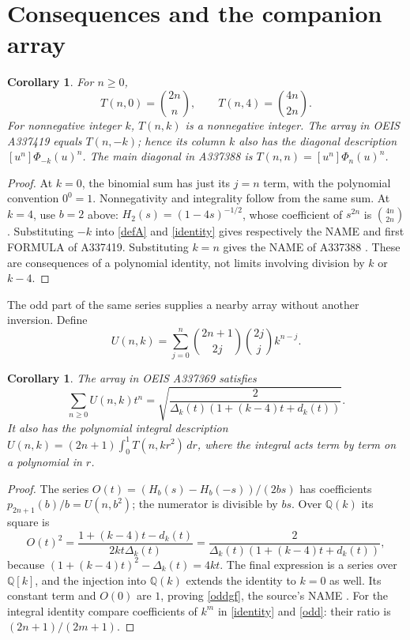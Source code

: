 \documentclass[11pt]{article}
\newtheorem{corollary}[theorem]{Corollary}
\begin{document}
\section{Consequences and the companion array}
\begin{corollary}\label{consequences}
For $n\geq0$,
\[
 T(n,0)=\binom{2n}n,\qquad T(n,4)=\binom{4n}{2n}.
\]
For nonnegative integer $k$, $T(n,k)$ is a nonnegative integer.
The array in OEIS A337419 equals $T(n,-k)$; hence its column $k$
also has the diagonal description $[u^n]\Phi_{-k}(u)^n$.
The main diagonal in A337388 is $T(n,n)=[u^n]\Phi_n(u)^n$.
\end{corollary}
\begin{proof}
At $k=0$, the binomial sum has just its $j=n$ term, with the
polynomial convention $0^0=1$. Nonnegativity and integrality follow
from the same sum. At $k=4$, use $b=2$ above:
$H_2(s)=(1-4s)^{-1/2}$, whose coefficient of $s^{2n}$ is
$\binom{4n}{2n}$. Substituting $-k$ into \eqref{defA} and
\eqref{identity} gives respectively the NAME and first FORMULA of
A337419. Substituting $k=n$ gives the NAME of A337388
\cite{signed,diagonal}. These are consequences of a polynomial identity,
not limits involving division by $k$ or $k-4$.
\end{proof}

The odd part of the same series supplies a nearby array without another
inversion. Define
\begin{equation}\label{odd}
 U(n,k)=\sum_{j=0}^n\binom{2n+1}{2j}\binom{2j}{j}k^{n-j}.
\end{equation}
\begin{corollary}\label{oddcor}
The array in OEIS A337369 satisfies
\begin{equation}\label{oddgf}
 \sum_{n\geq0}U(n,k)t^n
 =\sqrt{\frac{2}{\Delta_k(t)(1+(k-4)t+d_k(t))}}.
\end{equation}
It also has the polynomial integral description
$U(n,k)=(2n+1)\int_0^1T(n,kr^2)\,dr$,
where the integral acts term by term on a polynomial in $r$.
\end{corollary}
\begin{proof}
The series $O(t)=(H_b(s)-H_b(-s))/(2bs)$ has coefficients
$p_{2n+1}(b)/b=U(n,b^2)$; the numerator is divisible by $bs$.
Over $\mathbb Q(k)$ its square is
\[
 O(t)^2=\frac{1+(k-4)t-d_k(t)}{2kt\Delta_k(t)}
       =\frac{2}{\Delta_k(t)(1+(k-4)t+d_k(t))},
\]
because $(1+(k-4)t)^2-\Delta_k(t)=4kt$.
The final expression is a series over $\mathbb Q[k]$, and
the injection into $\mathbb Q(k)$ extends the identity to $k=0$
as well. Its constant term and $O(0)$ are $1$, proving
\eqref{oddgf}, the source's NAME \cite{oddarray}.
For the integral identity compare coefficients of $k^m$ in
\eqref{identity} and \eqref{odd}: their ratio is
$(2n+1)/(2m+1)$.
\end{proof}
\end{document}
